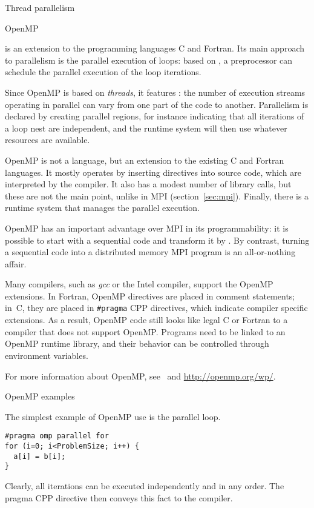  {Thread parallelism}
\label{sec:threads}


 {OpenMP}
\label{sec:openmp}

 is an extension to the programming languages
C and Fortran.
Its main approach to parallelism is the parallel execution of loops:
based on , a preprocessor can schedule the parallel
execution of the loop iterations.

Since OpenMP is based on \emph{threads},
it features : the number of
execution streams operating in parallel can vary from one part of the
code to another. Parallelism is declared by creating
parallel regions, for instance indicating that all iterations 
of a loop nest are independent,
and the runtime system will then use whatever resources
are available.

OpenMP is not a language, but an extension to the existing C and
Fortran languages. It mostly operates by inserting
directives into source code, which are interpreted by the
compiler. It also has a modest number of library calls, but these are
not the main point, unlike in MPI (section~\ref{sec:mpi}). Finally,
there is a runtime system that manages the parallel execution.

OpenMP has an important advantage over MPI in its programmability:
it is possible to start with a sequential code and transform
it by . By contrast,
turning a sequential code into a distributed memory MPI program
is an all-or-nothing affair.

Many compilers, such as \emph{gcc} or the Intel compiler, support
the OpenMP extensions. In Fortran, OpenMP directives are placed in
comment statements; in~C, they are placed in \verb+#pragma+ CPP
directives, which indicate compiler specific extensions. As a result,
OpenMP code still looks like legal C or Fortran to a compiler that
does not support OpenMP. Programs need to be linked to an OpenMP
runtime library, and their behavior can be controlled through
environment variables.

For more information about OpenMP, see~\cite{Chapman2008:OpenMPbook}
and \url{http://openmp.org/wp/}.

 {OpenMP examples}
\label{omp:examples}

The simplest example of OpenMP use is the parallel loop. 
\lstset{language=C}
\begin{lstlisting}
#pragma omp parallel for
for (i=0; i<ProblemSize; i++) {
  a[i] = b[i];
}
\end{lstlisting}
Clearly, all iterations can be executed independently and in any
order. The pragma CPP directive then conveys this fact to the
compiler.

